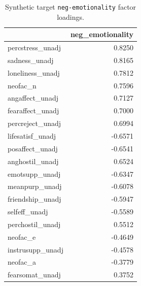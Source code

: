 \documentclass{article}
\begin{document}
\begin{table}[H]
\centering
\begin{tabular}{lr}
\toprule
 & neg\_emotionality \\
\midrule
percstress\_unadj & 0.8250 \\
sadness\_unadj & 0.8165 \\
loneliness\_unadj & 0.7812 \\
neofac\_n & 0.7596 \\
angaffect\_unadj & 0.7127 \\
fearaffect\_unadj & 0.7000 \\
percreject\_unadj & 0.6994 \\
lifesatisf\_unadj & -0.6571 \\
posaffect\_unadj & -0.6541 \\
anghostil\_unadj & 0.6524 \\
emotsupp\_unadj & -0.6347 \\
meanpurp\_unadj & -0.6078 \\
friendship\_unadj & -0.5947 \\
selfeff\_unadj & -0.5589 \\
perchostil\_unadj & 0.5512 \\
neofac\_e & -0.4649 \\
instrusupp\_unadj & -0.4578 \\
neofac\_a & -0.3779 \\
fearsomat\_unadj & 0.3752 \\
\bottomrule
\end{tabular}

\footnotesize
\caption{Synthetic target \texttt{neg-emotionality} factor loadings.}
\normalsize
\label{tab:neg-emotionality}
\end{table}
\end{document}
